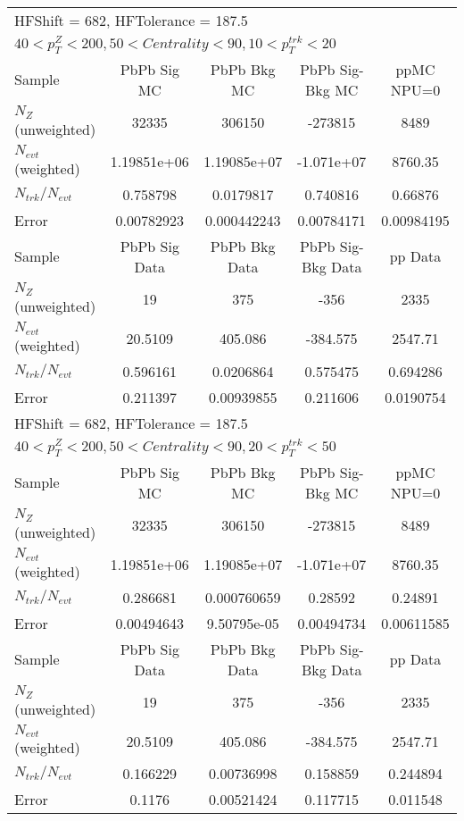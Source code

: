 \begin{table}[h!]
\centering
\begin{tabular}{|l|c|c|c|c|}
\multicolumn{5}{l}{ HFShift = 682, HFTolerance = 187.5}\\
\multicolumn{5}{l}{ $40 < p_{T}^{Z} < 200, 50 < Centrality < 90, 10 < p_{T}^{trk} < 20$}\\
\hline\hline
Sample         & PbPb Sig MC    & PbPb Bkg MC    & PbPb Sig-Bkg MC& ppMC NPU=0     \\
$N_Z$ (unweighted)& 32335          & 306150         & -273815        & 8489           \\
$N_{evt}$ (weighted)& 1.19851e+06    & 1.19085e+07    & -1.071e+07     & 8760.35        \\
$N_{trk}/N_{evt}$& 0.758798       & 0.0179817      & 0.740816       & 0.66876        \\
Error          & 0.00782923     & 0.000442243    & 0.00784171     & 0.00984195     \\
\hline
Sample         & PbPb Sig Data  & PbPb Bkg Data  & PbPb Sig-Bkg Data& pp Data  \\
$N_Z$ (unweighted)& 19             & 375            & -356           & 2335           \\
$N_{evt}$ (weighted)& 20.5109        & 405.086        & -384.575       & 2547.71        \\
$N_{trk}/N_{evt}$& 0.596161       & 0.0206864      & 0.575475       & 0.694286       \\
Error          & 0.211397       & 0.00939855     & 0.211606       & 0.0190754      \\
\hline\hline
\multicolumn{5}{l}{ HFShift = 682, HFTolerance = 187.5}\\
\multicolumn{5}{l}{ $40 < p_{T}^{Z} < 200, 50 < Centrality < 90, 20 < p_{T}^{trk} < 50$}\\
\hline\hline
Sample         & PbPb Sig MC    & PbPb Bkg MC    & PbPb Sig-Bkg MC& ppMC NPU=0     \\
$N_Z$ (unweighted)& 32335          & 306150         & -273815        & 8489           \\
$N_{evt}$ (weighted)& 1.19851e+06    & 1.19085e+07    & -1.071e+07     & 8760.35        \\
$N_{trk}/N_{evt}$& 0.286681       & 0.000760659    & 0.28592        & 0.24891        \\
Error          & 0.00494643     & 9.50795e-05    & 0.00494734     & 0.00611585     \\
\hline
Sample         & PbPb Sig Data  & PbPb Bkg Data  & PbPb Sig-Bkg Data& pp Data  \\
$N_Z$ (unweighted)& 19             & 375            & -356           & 2335           \\
$N_{evt}$ (weighted)& 20.5109        & 405.086        & -384.575       & 2547.71        \\
$N_{trk}/N_{evt}$& 0.166229       & 0.00736998     & 0.158859       & 0.244894       \\
Error          & 0.1176         & 0.00521424     & 0.117715       & 0.011548       \\
\hline\hline
\end{tabular}
\end{table}
